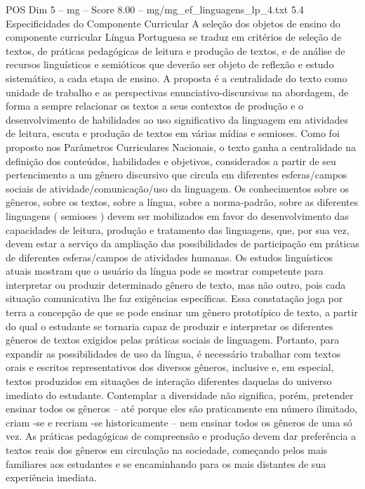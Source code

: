 \begin{textsample}{POS Dim 5 – mg – Score 8.00 – mg/mg\_ef\_linguagens\_lp\_4.txt}  \label{ex:f5_pos_182}
5.4 Especificidades do Componente Curricular A seleção dos objetos de ensino do componente curricular Língua Portuguesa se traduz em critérios de seleção de textos, de práticas pedagógicas de leitura e produção de textos, e de análise de recursos linguísticos e semióticos que deverão ser objeto de reflexão e estudo sistemático, a cada etapa de ensino.
A proposta é a centralidade do texto como unidade de trabalho e as perspectivas enunciativo-discursivas na abordagem, de forma a sempre relacionar os textos a seus contextos de produção e o desenvolvimento de habilidades ao uso significativo da linguagem em atividades de leitura, escuta e produção de textos em várias mídias e semioses.
Como foi proposto nos Parâmetros Curriculares Nacionais, o texto ganha a centralidade na definição dos conteúdos, habilidades e objetivos, considerados a partir de seu pertencimento a um gênero discursivo que circula em diferentes esferas/campos sociais de atividade/comunicação/uso da linguagem.
Os conhecimentos sobre os gêneros, sobre os textos, sobre a língua, sobre a norma-padrão, sobre as diferentes linguagens ( semioses ) devem ser mobilizados em favor do desenvolvimento das capacidades de leitura, produção e tratamento das linguagens, que, por sua vez, devem estar a serviço da ampliação das possibilidades de participação em práticas de diferentes esferas/campos de atividades humanas.
Os estudos linguísticos atuais mostram que o usuário da língua pode se mostrar competente para interpretar ou produzir determinado gênero de texto, mas não outro, pois cada situação comunicativa lhe faz exigências específicas.
Essa constatação joga por terra a concepção de que se pode ensinar um gênero prototípico de texto, a partir do qual o estudante se tornaria capaz de produzir e interpretar os diferentes gêneros de textos exigidos pelas práticas sociais de linguagem.
Portanto, para expandir as possibilidades de uso da língua, é necessário trabalhar com textos orais e escritos representativos dos diversos gêneros, inclusive e, em especial, textos produzidos em situações de interação diferentes daquelas do universo imediato do estudante.
Contemplar a diversidade não significa, porém, pretender ensinar todos os gêneros – até porque eles são praticamente em número ilimitado, criam -se e recriam -se historicamente – nem ensinar todos os gêneros de uma só vez.
As práticas pedagógicas de compreensão e produção devem dar preferência a textos reais dos gêneros em circulação na sociedade, começando pelos mais familiares aos estudantes e se encaminhando para os mais distantes de sua experiência imediata.

\end{textsample}
